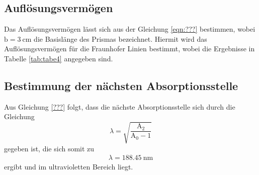 \subsection{Auflösungsvermögen}
Das Auflösungsvermögen lässt sich aus der Gleichung \ref{eqn:???}
bestimmen, wobei $\text{b}=\SI{3}{\centi\meter}$ die Basislänge des Prismas
bezeichnet.
Hiermit wird das Auflösungsvermögen für die Fraunhofer Linien bestimmt, wobei die
Ergebnisse in Tabelle \ref{tab:tabe4} angegeben sind.


\subsection{Bestimmung der nächsten Absorptionsstelle}
Aus Gleichung \ref{???} folgt, dass die nächste Absorptionsstelle sich durch die
Gleichung
\begin{equation}
  \lambda = \sqrt{\frac{\text{A}_2}{\text{A}_0-1}}
\end{equation}
gegeben ist, die sich somit zu
\begin{align*}
    \lambda = \SI{188.45}{\nano\meter}
\end{align*}
ergibt und im ultravioletten Bereich liegt.
